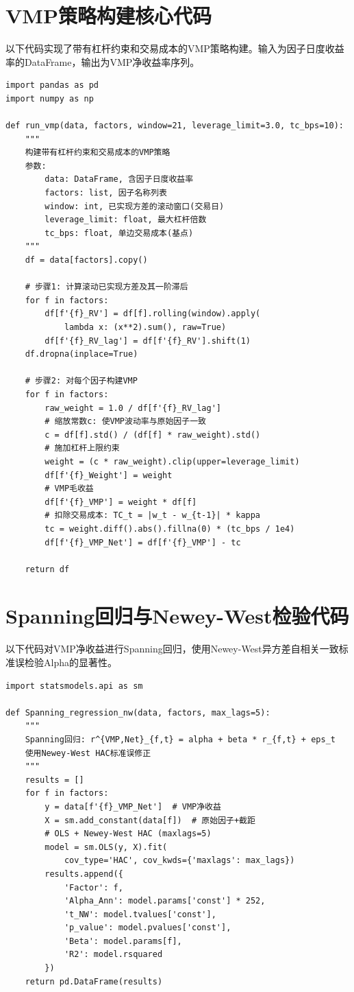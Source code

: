 \documentclass[
    decl-page,
    oneside,
  ]{njuthesis}
\begin{document}
\section{VMP策略构建核心代码}

以下代码实现了带有杠杆约束和交易成本的VMP策略构建。输入为因子日度收益率的DataFrame，输出为VMP净收益率序列。

\begin{lstlisting}[style=pythonstyle, caption={VMP策略构建函数}]
import pandas as pd
import numpy as np

def run_vmp(data, factors, window=21, leverage_limit=3.0, tc_bps=10):
    """
    构建带有杠杆约束和交易成本的VMP策略
    参数:
        data: DataFrame, 含因子日度收益率
        factors: list, 因子名称列表
        window: int, 已实现方差的滚动窗口(交易日)
        leverage_limit: float, 最大杠杆倍数
        tc_bps: float, 单边交易成本(基点)
    """
    df = data[factors].copy()

    # 步骤1: 计算滚动已实现方差及其一阶滞后
    for f in factors:
        df[f'{f}_RV'] = df[f].rolling(window).apply(
            lambda x: (x**2).sum(), raw=True)
        df[f'{f}_RV_lag'] = df[f'{f}_RV'].shift(1)
    df.dropna(inplace=True)

    # 步骤2: 对每个因子构建VMP
    for f in factors:
        raw_weight = 1.0 / df[f'{f}_RV_lag']
        # 缩放常数c: 使VMP波动率与原始因子一致
        c = df[f].std() / (df[f] * raw_weight).std()
        # 施加杠杆上限约束
        weight = (c * raw_weight).clip(upper=leverage_limit)
        df[f'{f}_Weight'] = weight
        # VMP毛收益
        df[f'{f}_VMP'] = weight * df[f]
        # 扣除交易成本: TC_t = |w_t - w_{t-1}| * kappa
        tc = weight.diff().abs().fillna(0) * (tc_bps / 1e4)
        df[f'{f}_VMP_Net'] = df[f'{f}_VMP'] - tc

    return df
\end{lstlisting}

\section{Spanning回归与Newey-West检验代码}

以下代码对VMP净收益进行Spanning回归，使用Newey-West异方差自相关一致标准误检验Alpha的显著性。

\begin{lstlisting}[style=pythonstyle, caption={Spanning回归与Alpha检验}]
import statsmodels.api as sm

def Spanning_regression_nw(data, factors, max_lags=5):
    """
    Spanning回归: r^{VMP,Net}_{f,t} = alpha + beta * r_{f,t} + eps_t
    使用Newey-West HAC标准误修正
    """
    results = []
    for f in factors:
        y = data[f'{f}_VMP_Net']  # VMP净收益
        X = sm.add_constant(data[f])  # 原始因子+截距
        # OLS + Newey-West HAC (maxlags=5)
        model = sm.OLS(y, X).fit(
            cov_type='HAC', cov_kwds={'maxlags': max_lags})
        results.append({
            'Factor': f,
            'Alpha_Ann': model.params['const'] * 252,
            't_NW': model.tvalues['const'],
            'p_value': model.pvalues['const'],
            'Beta': model.params[f],
            'R2': model.rsquared
        })
    return pd.DataFrame(results)
\end{lstlisting}
\end{document}
